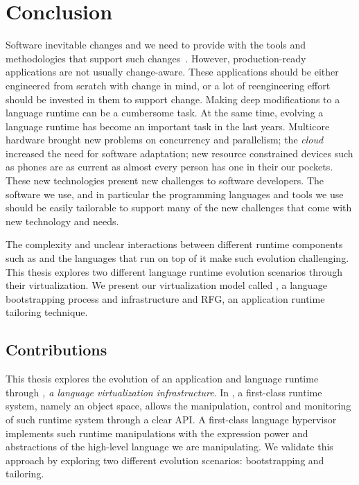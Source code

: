 
\chapter{Conclusion}
\minitoc
\introduction

Software inevitable changes and we need to provide with the tools and methodologies that support such changes~\cite{Nier08b}. However, production-ready applications are not usually change-aware. These applications should be either engineered from scratch with change in mind, or a lot of reengineering effort should be invested in them to support change. Making deep modifications to a language runtime can be a cumbersome task.
At the same time, evolving a language runtime has become an important task in the last years. Multicore hardware brought new problems on concurrency and parallelism; the \emph{cloud} increased the need for software adaptation; new resource constrained devices such as phones are as current as almost every person has one in their our pockets. These new technologies present new challenges to software developers. The software we use, and in particular the programming languages and tools we use should be easily tailorable to support many of the new challenges that come with new technology and needs.

The complexity and unclear interactions between different runtime components such as \VMs and the languages that run on top of it make such evolution challenging. This thesis explores two different language runtime evolution scenarios through their virtualization. We present our virtualization model called \Vtt, a language bootstrapping process and infrastructure and RFG, an application runtime tailoring technique.

\section{Contributions}

This thesis explores the evolution of an application and language runtime through \emph{\Vtt, a language virtualization infrastructure}. In \Vtt, a first-class runtime system, namely an object space, allows the manipulation, control and monitoring of such runtime system through a clear API. A first-class language hypervisor implements such runtime manipulations with the expression power and abstractions of the high-level language we are manipulating. We validate this approach by exploring two different evolution scenarios: bootstrapping and tailoring.

